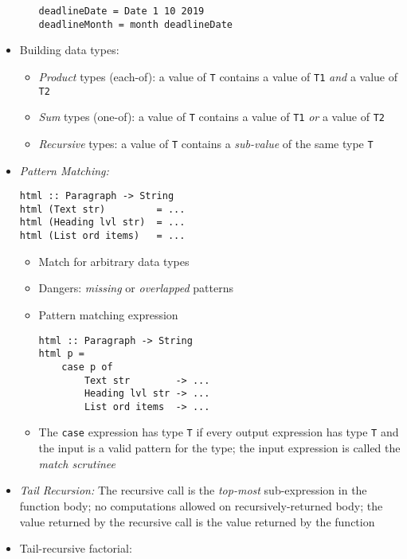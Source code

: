 \documentclass[landscape,8pt]{extarticle}
\newcommand{\code}{\lstinline}
\begin{document}
\begin{multicols}{3}
\begin{itemize}
\begin{itemize}
\begin{lstlisting}
deadlineDate = Date 1 10 2019
deadlineMonth = month deadlineDate
               \end{lstlisting}
              \end{itemize}
        \item Building data types:
              \begin{itemize}
                  \item \emph{Product} types (each-of): a value of \code{T} contains a value of \code{T1} \emph{and} a value of \code{T2}
                  \item \emph{Sum} types (one-of): a value of \code{T} contains a value of \code{T1} \emph{or} a value of \code{T2}
                  \item \emph{Recursive} types: a value of \code{T} contains a \emph{sub-value} of the same type \code{T}
              \end{itemize}
        \item \emph{Pattern Matching:}
              \begin{lstlisting}
html :: Paragraph -> String
html (Text str)         = ...
html (Heading lvl str)  = ...
html (List ord items)   = ...
\end{lstlisting}
              \begin{itemize}
                  \item Match for arbitrary data types
                  \item Dangers: \emph{missing} or \emph{overlapped} patterns
                  \item Pattern matching expression
                        \begin{lstlisting}
html :: Paragraph -> String
html p =
    case p of
        Text str        -> ...
        Heading lvl str -> ...
        List ord items  -> ...
\end{lstlisting}
                  \item The \code{case} expression has type \code{T} if every output expression has type \code{T} and the input is a valid pattern for the type; the input expression is called the \emph{match scrutinee}
              \end{itemize}
        \item \emph{Tail Recursion:} The recursive call is the \emph{top-most} sub-expression in the function body; no computations allowed on recursively-returned body; the value returned by the recursive call is the value returned by the function
        \item Tail-recursive factorial:

\end{itemize}
\end{multicols}
\end{document}
